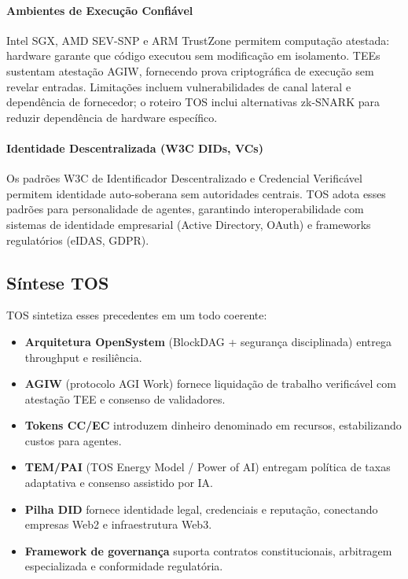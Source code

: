 \documentclass[11pt]{article}
\begin{document}
\paragraph{Ambientes de Execução Confiável} Intel SGX, AMD SEV-SNP e ARM TrustZone permitem computação atestada: hardware garante que código executou sem modificação em isolamento. TEEs sustentam atestação AGIW, fornecendo prova criptográfica de execução sem revelar entradas. Limitações incluem vulnerabilidades de canal lateral e dependência de fornecedor; o roteiro TOS inclui alternativas zk-SNARK para reduzir dependência de hardware específico.

\paragraph{Identidade Descentralizada (W3C DIDs, VCs)} Os padrões W3C de Identificador Descentralizado e Credencial Verificável permitem identidade auto-soberana sem autoridades centrais. TOS adota esses padrões para personalidade de agentes, garantindo interoperabilidade com sistemas de identidade empresarial (Active Directory, OAuth) e frameworks regulatórios (eIDAS, GDPR).

\subsection{Síntese TOS}
TOS sintetiza esses precedentes em um todo coerente:
\begin{itemize}[noitemsep]
  \item \textbf{Arquitetura OpenSystem} (BlockDAG + segurança disciplinada) entrega throughput e resiliência.
  \item \textbf{AGIW} (protocolo AGI Work) fornece liquidação de trabalho verificável com atestação TEE e consenso de validadores.
  \item \textbf{Tokens CC/EC} introduzem dinheiro denominado em recursos, estabilizando custos para agentes.
  \item \textbf{TEM/PAI} (TOS Energy Model / Power of AI) entregam política de taxas adaptativa e consenso assistido por IA.
  \item \textbf{Pilha DID} fornece identidade legal, credenciais e reputação, conectando empresas Web2 e infraestrutura Web3.
  \item \textbf{Framework de governança} suporta contratos constitucionais, arbitragem especializada e conformidade regulatória.
\end{itemize}
\end{document}
